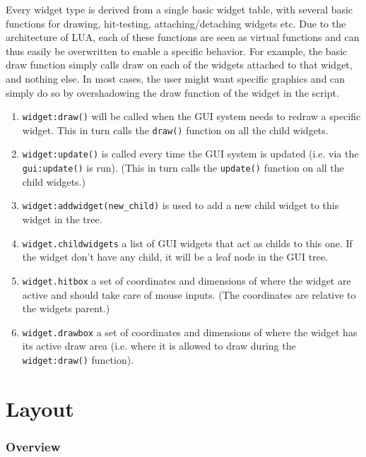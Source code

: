 Every widget type is derived from a single basic widget table, with several basic functions for drawing, hit-testing, attaching/detaching widgets etc. Due to the architecture of LUA, each of these functions are seen as virtual functions and can thus easily be overwritten to enable a specific behavior. For example, the basic draw function simply calls draw on each of the widgets attached to that widget, and nothing else. In most cases, the user might want specific graphics and can simply do so by overshadowing the draw function of the widget in the script. 
\begin{enumerate}
  \item \texttt{widget:draw()} will be called when the GUI system needs to redraw a specific widget. This in turn calls the \texttt{draw()} function on all the child widgets.
  \item \texttt{widget:update()} is called every time the GUI system is updated (i.e. via the \texttt{gui:update()} is run). (This in turn calls the \texttt{update()} function on all the child widgets.)
  \item \texttt{widget:addwidget(new\_child)} is used to add a new child widget to this widget in the tree.
  \item \texttt{widget.childwidgets} a list of GUI widgets that act as childs to this one. If the widget don't have any child, it will be a leaf node in the GUI tree.
  \item \texttt{widget.hitbox} a set of coordinates and dimensions of where the widget are active and should take care of mouse inputs. (The coordinates are relative to the widgets parent.)
  \item \texttt{widget.drawbox} a set of coordinates and dimensions of where the widget has its active draw area (i.e. where it is allowed to draw during the \texttt{widget:draw()} function).
\end{enumerate}

\section{Layout}

\subsubsection{Overview}


